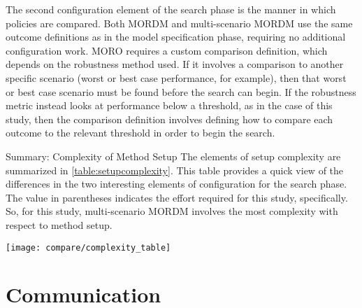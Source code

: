     The second configuration element of the search phase is the manner in which policies are compared. Both MORDM and multi-scenario MORDM use the same outcome definitions as in the model specification phase, requiring no additional configuration work. MORO requires a custom comparison definition, which depends on the robustness method used. If it involves a comparison to another specific scenario (worst or best case performance, for example), then that worst or best case scenario must be found before the search can begin. If the robustness metric instead looks at performance below a threshold, as in the case of this study, then the comparison definition involves defining how to compare each outcome to the relevant threshold in order to begin the search. 
    
    \begin{comparisonbox}{Summary: Complexity of Method Setup}
        The elements of setup complexity are summarized in \cref{table:setupcomplexity}. This table provides a quick view of the differences in the two interesting elements of configuration for the search phase. The value in parentheses indicates the effort required for this study, specifically. So, for this study, multi-scenario MORDM involves the most complexity with respect to method setup. 
    \end{comparisonbox}
    
    \begin{table}[ht]
        \centering
        \captionsetup{width=0.70\textwidth}
        \caption[Setup Complexity of Methods]{Complexity of configuration in the policy alternative determination phase. Effort provides a qualitative idea of the amount of work required to configure the search, given an already specified model. }
        \label{table:setupcomplexity}
        
        \texttt{[image: compare/complexity\_table]}
    \end{table}
        
\section{Communication}\label{results-compare-communication}
